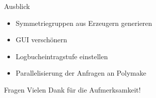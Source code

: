 \documentclass[ucs,11pt]{beamer}
\begin{document}
\begin{frame}{Ausblick}
\begin{itemize}
	\item Symmetriegruppen aus Erzeugern generieren
	\item GUI verschönern
	\item Logbucheintragstufe einstellen
	\item Parallelisierung der Anfragen an Polymake
\end{itemize}
\end{frame}


\begin{frame}[t]{Fragen}
\huge{Vielen Dank für die Aufmerksamkeit!} \\
\vspace{1cm}
\end{frame}
\end{document}
